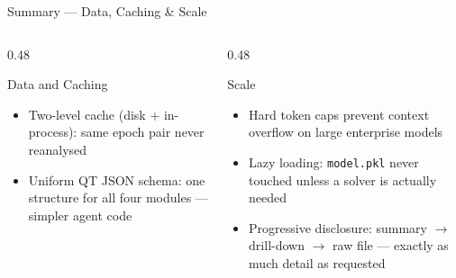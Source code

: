\documentclass[aspectratio=169,10pt]{beamer}
\begin{document}
\begin{frame}{Summary — Data, Caching \& Scale}
\begin{columns}[T]
  \begin{column}{0.48\textwidth}
    \begin{block}{Data and Caching}
      \begin{itemize}\setlength\itemsep{4pt}
        \item Two-level cache (disk + in-process): same epoch pair
              never reanalysed
        \item Uniform QT JSON schema: one structure for all four
              modules — simpler agent code
      \end{itemize}
    \end{block}
  \end{column}
  \begin{column}{0.48\textwidth}
    \begin{block}{Scale}
      \begin{itemize}\setlength\itemsep{4pt}
        \item Hard token caps prevent context overflow on
              large enterprise models
        \item Lazy loading: \texttt{model.pkl} never touched
              unless a solver is actually needed
        \item Progressive disclosure: summary $\to$ drill-down
              $\to$ raw file — exactly as much detail as requested
      \end{itemize}
    \end{block}
  \end{column}
\end{columns}
\end{frame}
\end{document}
